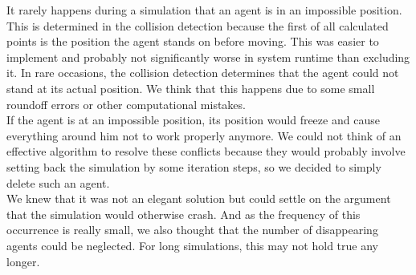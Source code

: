 \noi It rarely happens during a simulation that an agent is in an impossible position. This is determined in the collision detection because the first of all calculated points is the position the agent stands on before moving. This was easier to implement and probably not significantly worse in system runtime than excluding it. In rare occasions, the collision detection determines that the agent could not stand at its actual position. We think that this happens due to some small roundoff errors or other computational mistakes.\\
If the agent is at an impossible position, its position would freeze and cause everything around him not to work properly anymore. We could not think of an effective algorithm to resolve these conflicts because they would probably involve setting back the simulation by some iteration steps, so we decided to simply delete such an agent.\\
We knew that it was not an elegant solution but could settle on the argument that the simulation would otherwise crash. And as the frequency of this occurrence is really small, we also thought that the number of disappearing agents could be neglected. For long simulations, this may not hold true any longer.

